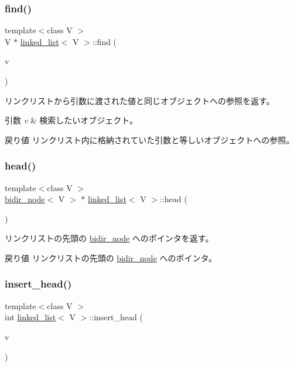 \subsubsection{\texorpdfstring{find()}{find()}}
{\footnotesize\ttfamily template$<$class V $>$ \\
V $\ast$ \hyperlink{classlinked__list}{linked\+\_\+list}$<$ V $>$\+::find (\begin{DoxyParamCaption}\item[{const V \&}]{v }\end{DoxyParamCaption})}

リンクリストから引数に渡された値と同じオブジェクトへの参照を返す。 
\begin{DoxyParams}{引数}
{\em v} & 検索したいオブジェクト。 \\
\hline
\end{DoxyParams}
\begin{DoxyReturn}{戻り値}
リンクリスト内に格納されていた引数と等しいオブジェクトへの参照。 
\end{DoxyReturn}
\hypertarget{classlinked__list_a5ec6ef95a6d392bb7389637d9e5d87b5}{}\label{classlinked__list_a5ec6ef95a6d392bb7389637d9e5d87b5} 
\subsubsection{\texorpdfstring{head()}{head()}}
{\footnotesize\ttfamily template$<$class V $>$ \\
\hyperlink{classbidir__node}{bidir\+\_\+node}$<$ V $>$ $\ast$ \hyperlink{classlinked__list}{linked\+\_\+list}$<$ V $>$\+::head (\begin{DoxyParamCaption}{ }\end{DoxyParamCaption})}

リンクリストの先頭の \hyperlink{classbidir__node}{bidir\+\_\+node} へのポインタを返す。 \begin{DoxyReturn}{戻り値}
リンクリストの先頭の \hyperlink{classbidir__node}{bidir\+\_\+node} へのポインタ。 
\end{DoxyReturn}
\hypertarget{classlinked__list_aa87b1801b0701151561b449df924a1f6}{}\label{classlinked__list_aa87b1801b0701151561b449df924a1f6} 
\subsubsection{\texorpdfstring{insert\+\_\+head()}{insert\_head()}}
{\footnotesize\ttfamily template$<$class V $>$ \\
int \hyperlink{classlinked__list}{linked\+\_\+list}$<$ V $>$\+::insert\+\_\+head (\begin{DoxyParamCaption}\item[{V \&}]{v }\end{DoxyParamCaption})}


